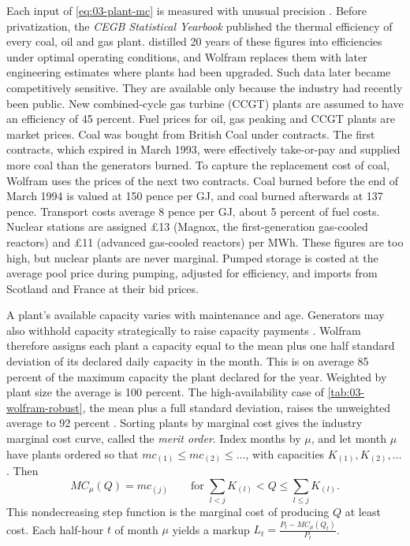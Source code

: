 Each input of \eqref{eq:03-plant-mc} is measured with unusual precision \citep[p.~810]{Wolfram1999}. Before
privatization, the \emph{CEGB Statistical Yearbook} published the thermal efficiency of every coal, oil and gas plant.
\citet{GreenNewbery1992} distilled 20 years of these figures into efficiencies under optimal operating conditions, and
Wolfram replaces them with later engineering estimates where plants had been upgraded. Such data later became
competitively sensitive. They are available only because the industry had recently been public. New combined-cycle gas
turbine (CCGT) plants are assumed to have an efficiency of 45 percent. Fuel prices for oil, gas peaking and CCGT plants
are market prices. Coal was bought from British Coal under contracts. The first contracts, which expired in March 1993,
were effectively take-or-pay and supplied more coal than the generators burned. To capture the replacement cost of coal,
Wolfram uses the prices of the next two contracts. Coal burned before the end of March 1994 is valued at 150 pence per
GJ, and coal burned afterwards at 137 pence. Transport costs average 8 pence per GJ, about 5 percent of fuel costs. Nuclear stations are
assigned \pounds 13 (Magnox, the first-generation gas-cooled reactors) and \pounds 11 (advanced gas-cooled reactors)
per MWh. These figures are too high, but
nuclear plants are never marginal. Pumped storage is costed at the average pool price during pumping, adjusted for
efficiency, and imports from Scotland and France at their bid prices.

A plant's available capacity varies with maintenance and age. Generators may also withhold capacity strategically to
raise capacity payments \citep{WolakPatrick1997}. Wolfram therefore assigns each plant a capacity equal to the mean
plus one half standard deviation of its declared daily capacity in the month. This is on average 85 percent of the
maximum capacity the plant declared for the year. Weighted by plant size the average is 100 percent. The high-availability case of \cref{tab:03-wolfram-robust}, the mean
plus a full standard deviation, raises the unweighted average to 92 percent \citep[pp.~810--811, 816]{Wolfram1999}.
Sorting plants by marginal cost
gives the industry marginal cost curve, called the \emph{merit order}. Index months by $\mu$, and let month $\mu$ have
plants ordered so that $mc_{(1)} \le mc_{(2)} \le \dots$, with capacities $K_{(1)}, K_{(2)}, \dots$. Then
\begin{equation}\label{eq:03-merit-order}
MC_\mu(Q) = mc_{(j)} \qquad \text{for } \sum_{l < j} K_{(l)} < Q \le \sum_{l \le j} K_{(l)}.
\end{equation}
This nondecreasing step function is the marginal cost of producing $Q$ at least cost. Each half-hour $t$ of month $\mu$
yields a markup $L_t = \frac{P_t - MC_\mu(Q_t)}{P_t}$.

